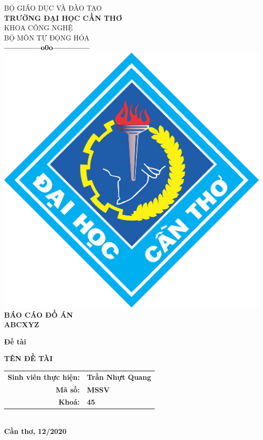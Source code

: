 \documentclass{standalone}
\begin{document}
\begin{titlepage}
\begin{center}
	{BỘ GIÁO DỤC VÀ ĐÀO TẠO}\\
	\textbf{TRƯỜNG ĐẠI HỌC CẦN THƠ}\\
	{KHOA CÔNG NGHỆ}\\
	{BỘ MÔN TỰ ĐỘNG HÓA}\\
	\textbf{--------------o0o--------------}\\[1.5cm]
	\includegraphics[scale=.12]{images/ctu-logo}\\[2.5cm]
	
	\textbf{BÁO CÁO ĐỒ ÁN\\}
	\textbf{ABCXYZ\\[2cm]}
	
	\begin{large}
	\textbf{Đề tài\\[0.5cm]}
	\end{large}
	\textbf{{\LARGE TÊN ĐỀ TÀI}}
	\\[2cm]

	

	\begin{tabular}{ r l }
	\textbf{Sinh viên thực hiện:} & \textbf{Trần Nhựt Quang}\\ 
	\textbf{Mã số:} & \textbf{MSSV}\\  
	\textbf{Khoá:} & \textbf{45}   
	\end{tabular}\\[2.5cm]
	\textbf{Cần thơ, 12/2020}
	
	
\end{center}
\end{titlepage}
\end{document}
